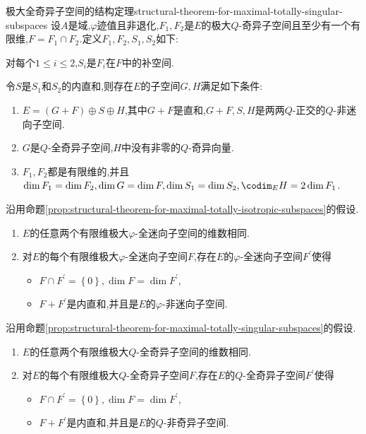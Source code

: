 \begin{proposition}{极大全奇异子空间的结构定理}{structural-theorem-for-maximal-totally-singular-subspaces}
	设$A$是域,$\varphi$迹值且非退化,$F_{1},F_{2}$是$E$的极大$Q$-奇异子空间且至少有一个有限维,$F=F_{1}\cap F_{2}$.定义$F_{1},F_{2},S_{1},S_{2}$如下:
	\begin{center}
		对每个$1\leq i\leq 2$,$S_{i}$是$F_{i}$在$F$中的补空间.
	\end{center}
	令$S$是$S_{1}$和$S_{2}$的内直和,则存在$E$的子空间$G,H$满足如下条件:
	\begin{enumerate}
		\item $E=\left(G+F\right)\oplus S\oplus H$,其中$G+F$是直和,$G+F,S,H$是两两$Q$-正交的$Q$-非迷向子空间.
		\item $G$是$Q$-全奇异子空间,$H$中没有非零的$Q$-奇异向量.
		\item $F_{1},F_{2}$都是有限维的,并且$\dim F_{1}=\dim F_{2},\dim G=\dim F,\dim S_{1}=\dim S_{2},\codim_{E}H=2\dim F_{1}$.
	\end{enumerate}
\end{proposition}

\begin{corollary}{}{}
	沿用命题\ref{prop:structural-theorem-for-maximal-totally-isotropic-subspaces}的假设.
	\begin{enumerate}
		\item $E$的任意两个有限维极大$\varphi$-全迷向子空间的维数相同.
		\item 对$E$的每个有限维极大$\varphi$-全迷向子空间$F$,存在$E$的$\varphi$-全迷向子空间$F^{\prime}$使得
		\begin{itemize}
			\item $F\cap F^{\prime}=\left\{0\right\},\dim F=\dim F^{\prime}$,
			\item $F+F^{\prime}$是内直和,并且是$E$的$\varphi$-非迷向子空间.
		\end{itemize}
	\end{enumerate}
\end{corollary}

\begin{corollary}{}{}
	沿用命题\ref{prop:structural-theorem-for-maximal-totally-singular-subspaces}的假设.
	\begin{enumerate}
		\item $E$的任意两个有限维极大$Q$-全奇异子空间的维数相同.
		\item 对$E$的每个有限维极大$Q$-全奇异子空间$F$,存在$E$的$Q$-全奇异子空间$F^{\prime}$使得
		\begin{itemize}
			\item $F\cap F^{\prime}=\left\{0\right\},\dim F=\dim F^{\prime}$,
			\item $F+F^{\prime}$是内直和,并且是$E$的$Q$-非奇异子空间.
		\end{itemize}
	\end{enumerate}
\end{corollary}

